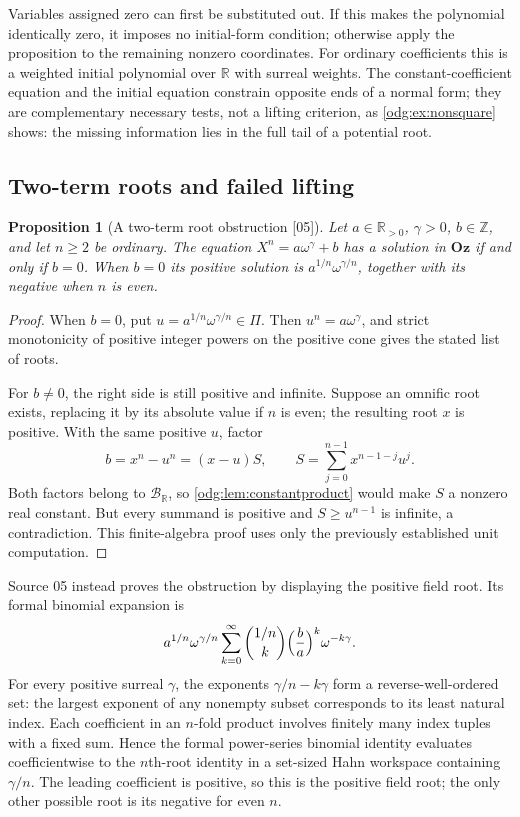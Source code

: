 \documentclass[11pt,oneside]{article}
\numberwithin{equation}{section}
\newtheorem{proposition}[proposition]{Proposition}
\theoremstyle{definition}
\theoremstyle{remark}
\newcommand{\Oz}{\mathbf{Oz}}
\newcommand{\Z}{\mathbb Z}
\newcommand{\R}{\mathbb R}
\newcommand{\BR}{\mathcal B_{\R}}
\newcommand{\src}[1]{\textup{\textsf{\small[#1]}}}
\begin{document}
Variables assigned zero can first be substituted out. If this makes the
polynomial identically zero, it imposes no initial-form condition; otherwise
apply the proposition to the remaining nonzero coordinates. For ordinary
coefficients this is a weighted initial polynomial over $\R$ with surreal
weights. The constant-coefficient equation and the initial equation constrain
opposite ends of a normal form; they are complementary necessary tests, not a
lifting criterion, as \cref{odg:ex:nonsquare} shows: the missing information
lies in the full tail of a potential root.

\subsection{Two-term roots and failed lifting}

\begin{proposition}[A two-term root obstruction \src{05}]\label{odg:prop:binomial}
Let $a\in\R_{>0}$, $\gamma>0$, $b\in\Z$, and let $n\ge2$ be ordinary. The
equation $X^n=a\omega^\gamma+b$ has a solution in $\Oz$ if and only if $b=0$.
When $b=0$ its positive solution is $a^{1/n}\omega^{\gamma/n}$, together with
its negative when $n$ is even.
\end{proposition}
\begin{proof}
When $b=0$, put $u=a^{1/n}\omega^{\gamma/n}\in\Pi$. Then
$u^n=a\omega^\gamma$, and strict monotonicity of positive integer powers
on the positive cone gives the stated list of roots.

For $b\ne0$, the right side is still positive and infinite. Suppose an
omnific root exists, replacing it by its absolute value if $n$ is even;
the resulting root $x$ is positive. With the same positive $u$, factor
\[
 b=x^n-u^n=(x-u)S,\qquad
 S=\sum_{j=0}^{n-1}x^{n-1-j}u^j.
\]
Both factors belong to $\BR$, so \cref{odg:lem:constantproduct} would make
$S$ a nonzero real constant. But every summand is positive and
$S\ge u^{n-1}$ is infinite, a contradiction. This finite-algebra proof
uses only the previously established unit computation.
\end{proof}

Source 05 instead proves the obstruction by displaying the positive field
root. Its formal binomial expansion is
\begin{equation}\label{odg:eq:binomial}
 a^{1/n}\omega^{\gamma/n}
 \sum_{k=0}^{\infty}\binom{1/n}{k}
 \Bigl(\frac ba\Bigr)^k\omega^{-k\gamma}.
\end{equation}
For every positive surreal $\gamma$, the exponents
$\gamma/n-k\gamma$ form a reverse-well-ordered set: the largest exponent
of any nonempty subset corresponds to its least natural index. Each
coefficient in an $n$-fold product involves finitely many index tuples
with a fixed sum. Hence the formal power-series binomial identity evaluates
coefficientwise to the $n$th-root identity in a set-sized Hahn workspace
containing $\gamma/n$. The leading coefficient is positive, so this is the
positive field root; the only other possible root is its negative for even
$n$.
\end{document}
